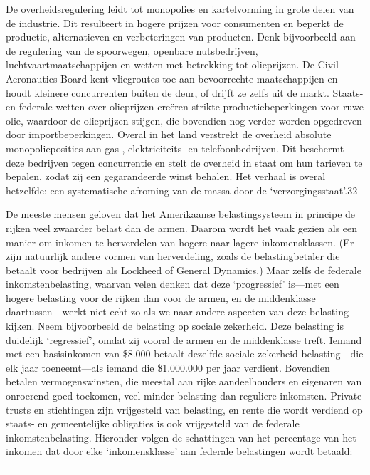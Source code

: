 \documentclass[
  a5paper,
  smalldemyvopaper,10pt,twoside,onecolumn,openright,extrafontsizes,hidelinks]{memoir}
\begin{document}
De overheidsregulering leidt tot monopolies en kartelvorming in grote
delen van de industrie. Dit resulteert in hogere prijzen voor
consumenten en beperkt de productie, alternatieven en verbeteringen van
producten. Denk bijvoorbeeld aan de regulering van de spoorwegen,
openbare nutsbedrijven, luchtvaartmaatschappijen en wetten met
betrekking tot olieprijzen. De Civil Aeronautics Board kent vliegroutes
toe aan bevoorrechte maatschappijen en houdt kleinere concurrenten
buiten de deur, of drijft ze zelfs uit de markt. Staats- en federale
wetten over olieprijzen creëren strikte productiebeperkingen voor ruwe
olie, waardoor de olieprijzen stijgen, die bovendien nog verder worden
opgedreven door importbeperkingen. Overal in het land verstrekt de
overheid absolute monopolieposities aan gas-, elektriciteits- en
telefoonbedrijven. Dit beschermt deze bedrijven tegen concurrentie en
stelt de overheid in staat om hun tarieven te bepalen, zodat zij een
gegarandeerde winst behalen. Het verhaal is overal hetzelfde: een
systematische afroming van de massa door de `verzorgingsstaat'.32

De meeste mensen geloven dat het Amerikaanse belastingsysteem in
principe de rijken veel zwaarder belast dan de armen. Daarom wordt het
vaak gezien als een manier om inkomen te herverdelen van hogere naar
lagere inkomensklassen. (Er zijn natuurlijk andere vormen van
herverdeling, zoals de belastingbetaler die betaalt voor bedrijven als
Lockheed of General Dynamics.) Maar zelfs de federale
inkomstenbelasting, waarvan velen denken dat deze `progressief' is---met
een hogere belasting voor de rijken dan voor de armen, en de
middenklasse daartussen---werkt niet echt zo als we naar andere aspecten
van deze belasting kijken. Neem bijvoorbeeld de belasting op sociale
zekerheid. Deze belasting is duidelijk `regressief', omdat zij vooral de
armen en de middenklasse treft. Iemand met een basisinkomen van \$8.000
betaalt dezelfde sociale zekerheid belasting---die elk jaar
toeneemt---als iemand die \$1.000.000 per jaar verdient. Bovendien
betalen vermogenswinsten, die meestal aan rijke aandeelhouders en
eigenaren van onroerend goed toekomen, veel minder belasting dan
reguliere inkomsten. Private trusts en stichtingen zijn vrijgesteld van
belasting, en rente die wordt verdiend op staats- en gemeentelijke
obligaties is ook vrijgesteld van de federale inkomstenbelasting.
Hieronder volgen de schattingen van het percentage van het inkomen dat
door elke `inkomensklasse' aan federale belastingen wordt betaald:

\begin{center}\rule{0.5\linewidth}{0.5pt}\end{center}
\end{document}
